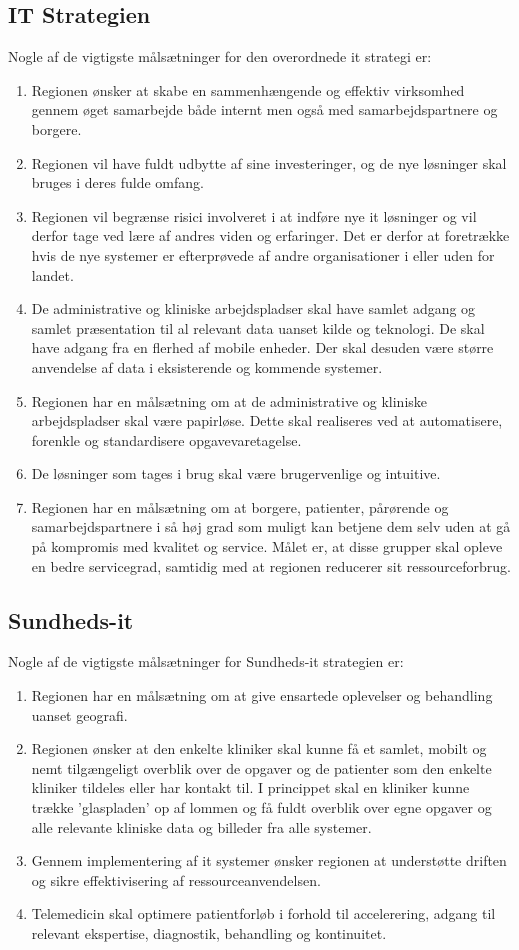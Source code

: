\subsection{IT Strategien}
Nogle af de vigtigste målsætninger for den overordnede it strategi er:
\begin{enumerate}
	\item Regionen ønsker at skabe en sammenhængende og effektiv virksomhed gennem øget samarbejde både internt men også med samarbejdspartnere og borgere.
	\item Regionen vil have fuldt udbytte af sine investeringer, og de nye løsninger skal bruges i deres fulde omfang.
	\item Regionen vil begrænse risici involveret i at indføre nye it løsninger og vil derfor tage ved lære af andres viden og erfaringer. Det er derfor at foretrække hvis de nye systemer er efterprøvede af andre organisationer i eller uden for landet.
	\item De administrative og kliniske arbejdspladser skal have samlet adgang og samlet præsentation til al relevant data uanset kilde og teknologi. De skal have adgang fra en flerhed af mobile enheder. Der skal desuden være større anvendelse af data i eksisterende og kommende systemer.
	\item Regionen har en målsætning om at de administrative og kliniske arbejdspladser skal være papirløse. Dette skal realiseres ved at automatisere, forenkle og standardisere opgavevaretagelse.
	\item De løsninger som tages i brug skal være brugervenlige og intuitive.
	\item Regionen har en målsætning om at borgere, patienter,
	pårørende og samarbejdspartnere i så høj grad som muligt kan betjene dem selv uden at gå på kompromis med kvalitet og service. Målet er, at disse grupper skal opleve en bedre servicegrad, samtidig med at regionen reducerer sit ressourceforbrug.
\end{enumerate}
\subsection{Sundheds-it}
Nogle af de vigtigste målsætninger for Sundheds-it strategien er:
\begin{enumerate}
	\item Regionen har en målsætning om at give ensartede oplevelser og behandling uanset geografi.
	\item Regionen ønsker at den enkelte kliniker skal kunne få et samlet, mobilt og nemt tilgængeligt overblik over de opgaver og de patienter som den enkelte kliniker tildeles eller har kontakt til. I princippet skal en kliniker kunne
	trække 'glaspladen' op af lommen og få fuldt overblik over egne opgaver og alle relevante kliniske data og billeder fra alle systemer.
	\item Gennem implementering af it systemer ønsker regionen at understøtte driften og sikre effektivisering af ressourceanvendelsen.
	\item Telemedicin skal optimere patientforløb i forhold til accelerering, adgang til relevant ekspertise, diagnostik, behandling og kontinuitet. 
\end{enumerate}
